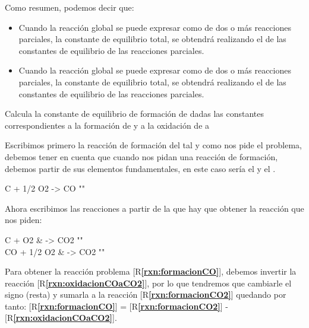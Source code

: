 Como resumen, podemos decir que:
\begin{itemize}
    \item Cuando la reacción global se puede expresar como  de dos o más reacciones parciales, la constante de equilibrio total, se obtendrá realizando el  de las constantes de equilibrio de las reacciones parciales.
    \item Cuando la reacción global se puede expresar como  de dos o más reacciones parciales, la constante de equilibrio total, se obtendrá realizando el  de las constantes de equilibrio de las reacciones parciales.
\end{itemize}
\begin{example}
    Calcula la constante de equilibrio de formación de  dadas las constantes correspondientes a la formación de  y a la oxidación de  a 


    Escribimos primero la reacción de formación del  tal y como nos pide el problema, debemos tener en cuenta que cuando nos pidan una reacción de formación, debemos partir de sus elementos fundamentales, en este caso sería el  y el .

    \begin{reaction}[Formación de CO]
        C \sld{} + 1/2 O2 \gas{} -> CO \gas{}
        "\label{rxn:formacionCO}"
    \end{reaction}

    Ahora escribimos las reacciones a partir de la que hay que obtener la reacción que nos piden:

    \begin{reactions}
        C \sld{} + O2 \gas{} & -> CO2 \gas{} "\label{rxn:formacionCO2}"\\
        CO \gas{} + 1/2 O2 \gas{} & -> CO2 \gas{} "\label{rxn:oxidacionCOaCO2}"
    \end{reactions}

    Para obtener la reacción problema [R\textcolor{blue}{\textbf{\ref{rxn:formacionCO}}}], debemos invertir la reacción
    [R\textcolor{blue}{\textbf{\ref{rxn:oxidacionCOaCO2}}}], por lo que tendremos que cambiarle el signo (resta) y sumarla a la reacción [R\textcolor{blue}{\textbf{\ref{rxn:formacionCO2}}}] quedando por tanto: [R\textcolor{blue}{\textbf{\ref{rxn:formacionCO}}}] = [R\textcolor{blue}{\textbf{\ref{rxn:formacionCO2}}}] - [R\textcolor{blue}{\textbf{\ref{rxn:oxidacionCOaCO2}}}].


\end{example}
